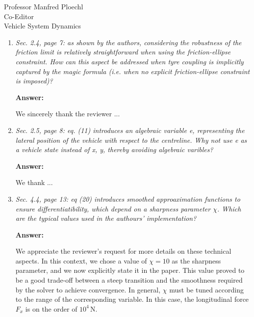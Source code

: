 \documentclass{letter}
\renewcommand\ul[1]{#1} %
\begin{document}
\begin{letter}{Professor Manfred Ploechl\\
Co-Editor\\
Vehicle System Dynamics}
\begin{enumerate}
\vspace{2mm}

\textbf{Answer:}

We thank the reviewer for giving the opportunity to clarify this point. Drawing on the experience from our previous works, we found that a discretization grid for the track of one point per meter is sufficient to obtain accurate results while keeping the computational time within reasonable limits. We observed that the same grid size also preserved the positive-definiteness of the covariance matrix $\bP$.

\hrulefill

\item
\textit{Sec. 2.4, page 7: as shown by the authors, considering the robustness of the friction limit is relatively straightforward when using the friction-ellipse constraint. How can this aspect be addressed when tyre coupling is implicitly captured by the magic formula (i.e. when no explicit friction-ellipse constraint is imposed)?}

\vspace{2mm}

\textbf{Answer:}

We sincerely thank the reviewer ...

\hrulefill

\item
\textit{Sec. 2.5, page 8: eq. (11) introduces an algebraic variable e, representing the lateral position of the vehicle with respect to the centreline. Why not use e as a vehicle state instead of x, y, thereby avoiding algebraic varibles?}

\vspace{2mm}

\textbf{Answer:}

We thank ...

\hrulefill

\item
\textit{Sec. 4.4, page 13: eq (20) introduces smoothed approaximation functions to ensure differentiatibility, which depend on a sharpness parameter $\chi$. Which are the typical values used in the authours' implementation?}

\vspace{2mm}

\textbf{Answer:}

We appreciate the reviewer's request \ul{for more details on these technical aspects.} In this context, we chose a value of $\chi=10$ as the sharpness parameter, and we now explicitly state it in the paper. This value proved to be a good trade-off between a steep transition and the smoothness required by the solver to achieve convergence. In general, $\chi$ must be tuned according to the range of the corresponding variable. In this case, the longitudinal force $F_x$ is on the order of $10^4$\,N.


\end{enumerate}
\end{letter}
\end{document}
